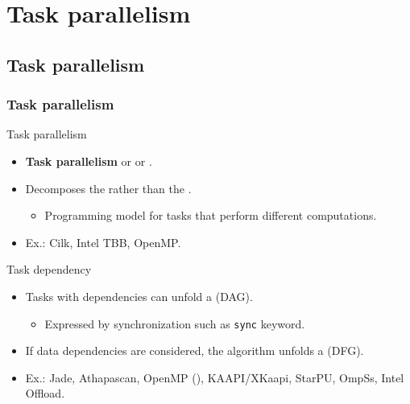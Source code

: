 \section{Task parallelism}
\subsection{Task parallelism}
\begin{frame}
  \frametitle{Task parallelism}
  \begin{block}{Task parallelism}
    \begin{itemize}
    \item {\bf Task parallelism} or  or .
    \item Decomposes the  rather than the .
      \begin{itemize}
      \item Programming model for tasks that perform different computations.
      \end{itemize}
    \item Ex.: Cilk, Intel TBB, OpenMP.
    \end{itemize}
  \end{block}
  \pause
  \begin{exampleblock}{Task dependency}
    \begin{itemize}
    \item Tasks with dependencies can unfold a  (DAG).
      \begin{itemize}
      \item Expressed by synchronization such as \texttt{sync} keyword.
      \end{itemize}
    \item If data dependencies are considered, the algorithm unfolds a  (DFG).
    \item Ex.: Jade, Athapascan, OpenMP (), KAAPI/XKaapi, StarPU, OmpSs, 
      Intel Offload.
    \end{itemize}
  \end{exampleblock}
\end{frame}

